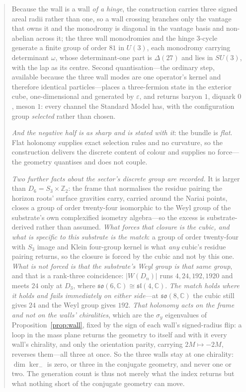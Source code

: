 \documentclass[11pt]{article}
\newcommand{\so}{\mathfrak{so}}
\begin{document}
\begin{abstract}
Because the wall is a wall \emph{of a hinge}, the construction carries three signed areal radii rather than one, so a wall crossing branches only the vantage that owns it and the monodromy is diagonal in the vantage basis and non-abelian across it; the three wall monodromies and the hinge $3$-cycle generate a finite group of order $81$ in $U(3)$, each monodromy carrying determinant $\omega$, whose determinant-one part is $\Delta(27)$ and lies in $SU(3)$, with the lap as its centre. Second quantisation---the ordinary step, available because the three wall modes are one operator's kernel and therefore identical particles---places a three-fermion state in the exterior cube, one-dimensional and generated by $\varepsilon$, and returns baryon $1$, diquark $0$, meson $1$: every channel the Standard Model has, with the configuration group \emph{selected} rather than chosen. 

\emph{And the negative half is as sharp and is stated with it}: the bundle is \emph{flat}. Flat holonomy supplies exact selection rules and no curvature, so the construction delivers the discrete content of colour and supplies no force---the geometry quantises and does not couple. 

\emph{Two further facts about the sector's discrete group are recorded.} It is larger than $D_{6}=S_{3}\times\mathbb{Z}_{2}$: the frame that normalises the residue pairing the horizon roots' surface gravities carry, carried around the Nariai points, closes a group of order twenty-four isomorphic to the Weyl group of the substrate's own complexified isometry algebra---so the excess is substrate-derived rather than assumed. \emph{What forces that closure is the cubic, and what is specific to this substrate is the match}: a group of order twenty-four with $S_{3}$ image and Klein four-group kernel is what \emph{any} cubic's residue pairing returns, so the closure is forced by the cubic and not by this one. \emph{What is not forced is that the substrate's Weyl group is that same group}, and that is a rank-three coincidence: $|W(D_n)|$ runs $4,24,192,1920$ and meets $24$ only at $D_{3}$, where $\so(6,\mathbb{C})\cong\mathfrak{sl}(4,\mathbb{C})$. \emph{The match holds where it holds and fails immediately on either side}---at $\so(8,\mathbb{C})$ the cubic still gives $24$ and the Weyl group gives $192$. \emph{That holonomy acts on the frame and not on the walls' chiralities}, which are the $\sigma_{y}$ eigenvalues of Proposition~\ref{prop:wall}, fixed by the sign of each wall's signed-radius flip: a loop in the mass plane returns the geometry to itself and with it every wall's chirality, and only the orientation parity, carrying $2M\mapsto-2M$, reverses them---all three at once. So the three walls stay at one chirality: $\dim\ker_{-}$ is zero, or three in the conjugate geometry, and never one or two. The generation count is thus not merely what the index returns but what nothing short of the conjugate geometry can move. 


\end{abstract}
\end{document}
